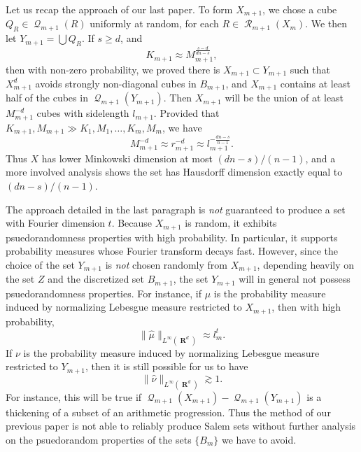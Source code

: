 \documentclass[12pt,reqno]{article}
\numberwithin{equation}{section}
\DeclareMathOperator{\RR}{\mathbf{R}}
\DeclareMathOperator{\DQ}{\mathcal{Q}}
\DeclareMathOperator{\DR}{\mathcal{R}}
\begin{document}
Let us recap the approach of our last paper. To form $X_{m+1}$, we chose a cube $Q_R \in \DQ_{m+1}(R)$ uniformly at random, for each $R \in \DR_{m+1}(X_m)$. We then let $Y_{m+1} = \bigcup Q_R$. If $s \geq d$, and
%
\begin{equation} \label{equation12904190249102}
    K_{m+1} \approx M_{m+1}^{\frac{s - d}{dn - s}},
\end{equation}
%
then with non-zero probability, we proved there is $X_{m+1} \subset Y_{m+1}$ such that $X_{m+1}^d$ avoids strongly non-diagonal cubes in $B_{m+1}$, and $X_{m+1}$ contains at least half of the cubes in $\DQ_{m+1}(Y_{m+1})$. Then $X_{m+1}$ will be the union of at least $M_{m+1}^{-d}$ cubes with sidelength $l_{m+1}$. Provided that $K_{m+1}, M_{m+1} \gg K_1, M_1, \dots, K_m, M_m$, we have
%
\[ M_{m+1}^{-d} \approx r_{m+1}^{-d} \approx l_{m+1}^{-\frac{dn - s}{n-1}}. \]
%
Thus $X$ has lower Minkowski dimension at most $(dn - s)/(n-1)$, and a more involved analysis shows the set has Hausdorff dimension exactly equal to $(dn - s)/(n-1)$.

The approach detailed in the last paragraph is \emph{not} guaranteed to produce a set with Fourier dimension $t$. Because $X_{m+1}$ is random, it exhibits psuedorandomness properties with high probability. In particular, it supports probability measures whose Fourier transform decays fast. However, since the choice of the set $Y_{m+1}$ is \emph{not} chosen randomly from $X_{m+1}$, depending heavily on the set $Z$ and the discretized set $B_{m+1}$, the set $Y_{m+1}$ will in general not possess psuedorandomness properties. For instance, if $\mu$ is the probability measure induced by normalizing Lebesgue measure restricted to $X_{m+1}$, then with high probability,
%
\[ \| \widehat{\mu} \|_{L^\infty(\RR^d)} \approx l_m^t. \]
%
If $\nu$ is the probability measure induced by normalizing Lebesgue measure restricted to $Y_{m+1}$, then it is still possible for us to have
%
\[ \| \widehat{\nu} \|_{L^\infty(\RR^d)} \gtrsim 1. \]
%
For instance, this will be true if $\DQ_{m+1}(X_{m+1}) - \DQ_{m+1}(Y_{m+1})$ is a thickening of a subset of an arithmetic progression. Thus the method of our previous paper is not able to reliably produce Salem sets without further analysis on the psuedorandom properties of the sets $\{ B_m \}$ we have to avoid.
\end{document}
